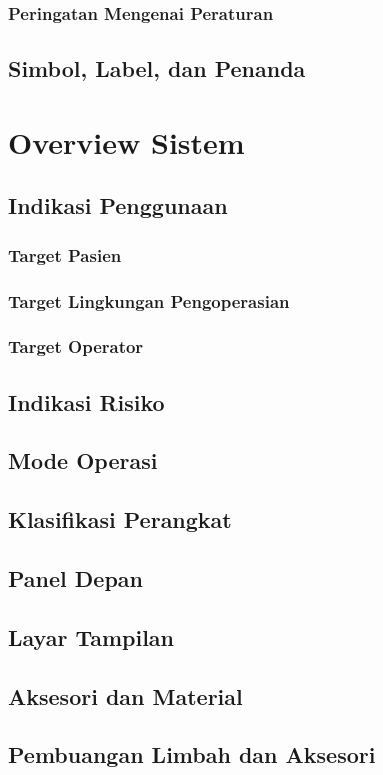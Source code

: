 \documentclass[11pt,a4paper,twoside,draft,onecolumn]{book}
\begin{document}
	\subsection{Peringatan Mengenai Peraturan}
	\section{Simbol, Label, dan Penanda}
	\newpage
	
	\chapter{Overview Sistem}
	\section{Indikasi Penggunaan}
	\subsection{Target Pasien}
	\subsection{Target Lingkungan Pengoperasian}
	\subsection{Target Operator}
	\section{Indikasi Risiko}
	\section{Mode Operasi}
	\section{Klasifikasi Perangkat}
	\section{Panel Depan}
	\section{Layar Tampilan}
	\section{Aksesori dan Material}
	\section{Pembuangan Limbah dan Aksesori}
	\newpage
	
\end{document}
